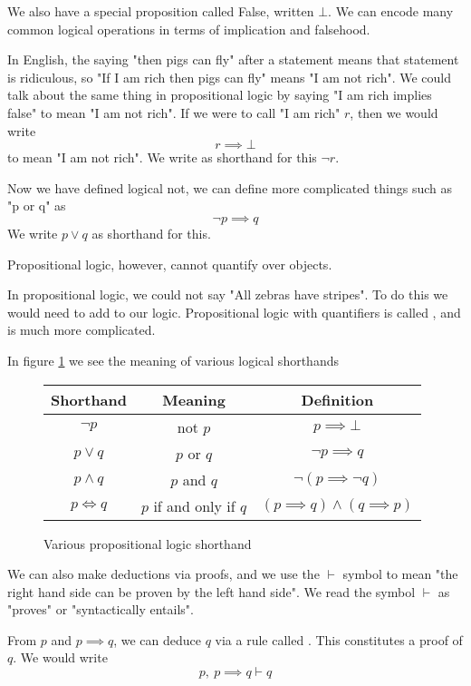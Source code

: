 \documentclass[11pt]{article}
\begin{document}
We also have a special proposition called False, written $\bot$. We can encode many common logical operations in terms of implication and falsehood. 
\begin{eg}
    In English, the saying "then pigs can fly" after a statement means that statement is ridiculous, so "If I am rich then pigs can fly" means "I am not rich". We could talk about the same thing in propositional logic by saying "I am rich implies false" to mean "I am not rich". If we were to call "I am rich" $r$, then we would write \[r \implies \bot\] to mean "I am not rich". We write as shorthand for this $\neg r$.
\end{eg}
\begin{eg}[Logical or]
    Now we have defined logical not, we can define more complicated things such as "p or q" as \[\neg p \implies q\]
    We write $p \vee q$ as shorthand for this.
\end{eg}
Propositional logic, however, cannot quantify over objects.
\begin{eg}
    In propositional logic, we could not say "All zebras have stripes". To do this we would need to add  to our logic. Propositional logic with quantifiers is called , and is much more complicated.
\end{eg}
In figure \ref{fig:propositionalLogicShorthand} we see the meaning of various logical shorthands
\begin{figure}[H]
    \caption{Various propositional logic shorthand}
    \label{fig:propositionalLogicShorthand}
    \centering
    \begin{tabular}{|c|c|c|}
        \hline
        Shorthand & Meaning & Definition \\ \hline \hline
        $\neg p$ & not $p$ & $p \implies \bot$ \\ \hline
        $p \lor q$ & $p$ or $q$ & $\neg p \implies q$\\ \hline  
        $p \land q$ & $p$ and $q$ & $\neg(p \implies \neg q)$ \\ \hline
        $p \iff q$ & $p$ if and only if $q$ & $(p \implies q) \land (q \implies p)$ \\ \hline
    \end{tabular}
\end{figure}
We can also make deductions via proofs, and we use the $\vdash$ symbol to mean "the right hand side can be proven by the left hand side". We read the symbol $\vdash$ as "proves" or "syntactically entails".
\begin{eg}[Deductions]
From $p$ and $p \implies q$, we can deduce $q$ via a rule called . This constitutes a proof of $q$. We would write
\[p, \ p \implies q \vdash q \]
\end{eg}
\end{document}
